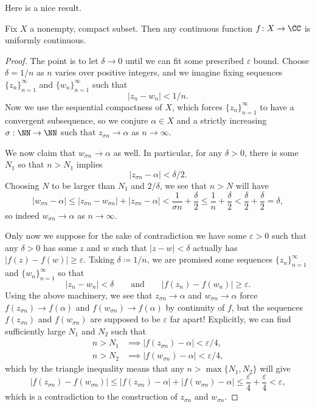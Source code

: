 Here is a nice result.
\begin{proposition} \label{prop:contcompactgetsuniform}
	Fix $X$ a nonempty, compact subset. Then any continuous function $f\colon X\to\CC$ is uniformly continuous.
\end{proposition}
\begin{proof}
	The point is to let $\delta\to0$ until we can fit some prescribed $\varepsilon$ bound. Choose $\delta=1/n$ as $n$ varies over positive integers, and we imagine fixing sequences $\{z_n\}_{n=1}^\infty$ and $\{w_n\}_{n=1}^\infty$ such that
	\[|z_n-w_n|<1/n.\]
	Now we use the sequential compactness of $X$, which forces $\{z_n\}_{n=1}^\infty$ to have a convergent subsequence, so we conjure $\alpha\in X$ and a strictly increasing $\sigma:\NN\to\NN$ such that $z_{\sigma n}\to\alpha$ as $n\to\infty$.

	We now claim that $w_{\sigma n}\to\alpha$ as well. In particular, for any $\delta>0$, there is some $N_1$ so that $n>N_1$ implies
	\[|z_{\sigma n}-\alpha|<\delta/2.\]
	Choosing $N$ to be larger than $N_1$ and $2/\delta$, we see that $n>N$ will have
	\[|w_{\sigma n}-\alpha|\le|z_{\sigma n}-w_{\sigma n}|+|z_{\sigma n}-\alpha|<\frac1{\sigma n}+\frac\delta2\le\frac1n+\frac\delta2<\frac\delta2+\frac\delta2=\delta,\]
	so indeed $w_{\sigma n}\to\alpha$ as $n\to\infty$.

	Only now we suppose for the sake of contradiction we have some $\varepsilon>0$ such that any $\delta>0$ has some $z$ and $w$ such that $|z-w|<\delta$ actually has $|f(z)-f(w)|\ge\varepsilon$. Taking $\delta\coloneqq 1/n$, we are promised some sequences $\{z_n\}_{n=1}^\infty$ and $\{w_n\}_{n=1}^\infty$ so that
	\[|z_n-w_n|<\delta\qquad\text{and}\qquad|f(z_n)-f(w_n)|\ge\varepsilon.\]
	Using the above machinery, we see that $z_{\sigma n}\to\alpha$ and $w_{\sigma n}\to\alpha$ force $f(z_{\sigma n})\to f(\alpha)$ and $f(w_{\sigma n})\to f(\alpha)$ by continuity of $f$, but the sequences $f(z_{\sigma n})$ and $f(w_{\sigma n})$ are supposed to be $\varepsilon$ far apart! Explicitly, we can find sufficiently large $N_1$ and $N_2$ such that
	\begin{align*}
		n>N_1&\implies|f(z_{\sigma n})-\alpha|<\varepsilon/4, \\
		n>N_2&\implies|f(w_{\sigma n})-\alpha|<\varepsilon/4,
	\end{align*}
	which by the triangle inequality means that any $n>\max\{N_1,N_2\}$ will give
	\[|f(z_{\sigma n})-f(w_{\sigma n})|\le|f(z_{\sigma n})-\alpha|+|f(w_{\sigma n})-\alpha|\le\frac\varepsilon4+\frac\varepsilon4<\varepsilon,\]
	which is a contradiction to the construction of $z_{\sigma n}$ and $w_{\sigma n}$.
\end{proof}


